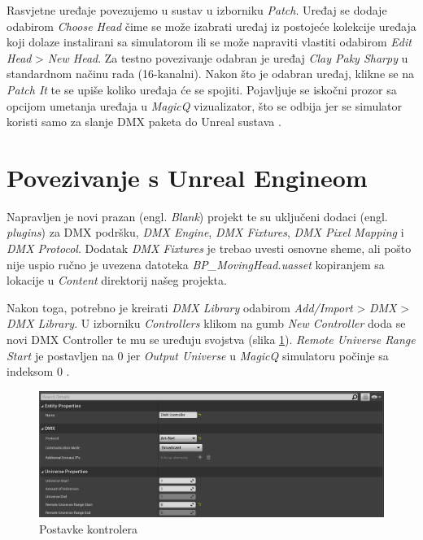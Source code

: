 \documentclass[times, utf8, zavrsni, numeric]{fer}
\begin{document}
Rasvjetne uređaje povezujemo u sustav u izborniku \emph{Patch}. Uređaj se dodaje odabirom \emph{Choose Head} čime se može izabrati uređaj iz postojeće kolekcije uređaja koji dolaze instalirani sa simulatorom ili se može napraviti vlastiti odabirom \emph{Edit Head} > \emph{New Head}. Za testno povezivanje odabran je uređaj \emph{Clay Paky Sharpy} u standardnom načinu rada (16-kanalni). Nakon što je odabran uređaj, klikne se na \emph{Patch It} te se upiše koliko uređaja će se spojiti. Pojavljuje se iskočni prozor sa opcijom umetanja uređaja u \emph{MagicQ} vizualizator, što se odbija jer se simulator koristi samo za slanje DMX paketa do Unreal sustava \cite{MagicQ_Manual}.

\section{Povezivanje s Unreal Engineom}
Napravljen je novi prazan (engl. \emph{Blank}) projekt te su uključeni dodaci (engl. \emph{plugins}) za DMX podršku, \emph{DMX Engine}, \emph{DMX Fixtures}, \emph{DMX Pixel Mapping} i \emph{DMX Protocol}. Dodatak \emph{DMX Fixtures} je trebao uvesti osnovne sheme, ali pošto nije uspio ručno je uvezena datoteka \emph{BP\_MovingHead.uasset} kopiranjem sa lokacije  u \emph{Content} direktorij našeg projekta.

Nakon toga, potrebno je kreirati \emph{DMX Library} odabirom \emph{Add/Import} > \emph{DMX} > \emph{DMX Library}. U izborniku \emph{Controllers} klikom na gumb \emph{New Controller} doda se novi DMX Controller te mu se uređuju svojstva (slika \ref{fig:slika 6-1}). \emph{Remote Universe Range Start} je postavljen na 0 jer \emph{Output Universe} u \emph{MagicQ} simulatoru počinje sa indeksom 0 \cite{MagicQ_Setup}.

\begin{figure}[htp]
	\centering
	\includegraphics[width=\linewidth]{slika 6-1.png}
	\caption{Postavke kontrolera}
	\label{fig:slika 6-1}
\end{figure}
\end{document}
